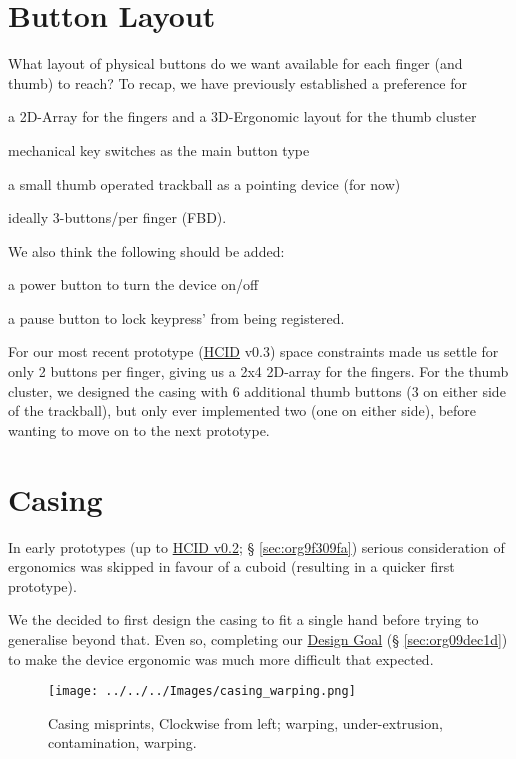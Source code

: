 \documentclass[logo,bsc,singlespacing,parskip]{infthesis}
\begin{document}
\section{Button Layout}
\label{sec:orged3e112}
What layout of physical buttons do we want available for each finger (and thumb) to reach?
To recap, we have previously established a preference for
\begin{enumerate*}[label={\arabic*)}, itemjoin={, \,}, itemjoin*={, and \,}]
\item a 2D-Array for the fingers and a 3D-Ergonomic layout for the thumb cluster
\item mechanical key switches as the main button type
\item a small thumb operated trackball as a pointing device (for now)
\item ideally 3-buttons/per finger (FBD).
\end{enumerate*}
We also think the following should be added:
\begin{enumerate*}[label={\arabic*)}, itemjoin={, \,}, itemjoin*={, and \,}]
\item a power button to turn the device on/off
\item a pause button to lock keypress' from being registered.
\end{enumerate*}

For our most recent prototype (\hyperref[org30e2275]{HCID} v0.3) space constraints made us settle for only 2 buttons per finger, giving us a 2x4 2D-array for the fingers.
For the thumb cluster, we designed the casing with 6 additional thumb buttons (3 on either side of the trackball), but only ever implemented two (one on either side), before wanting to move on to the next prototype.
\section{Casing}
\label{sec:orge2921a9}
In early prototypes (up to \hyperref[sec:org9f309fa]{HCID v0.2}; § \ref{sec:org9f309fa}) serious consideration of ergonomics was skipped in favour of a cuboid (resulting in a quicker first prototype).

We the decided to first design the casing to fit a single hand before trying to generalise beyond that.
Even so, completing our \hyperref[sec:org09dec1d]{Design Goal} (§ \ref{sec:org09dec1d}) to make the device ergonomic was much more difficult that expected.

\begin{wrapfigure}{r}{0.6\textwidth}
\centering
\texttt{[image: ../../../Images/casing\_warping.png]}
\caption[Casing misprints]{\label{fig:casing_misprints}Casing misprints, Clockwise from left; warping, under-extrusion, contamination, warping.}
\end{wrapfigure}
\end{document}
